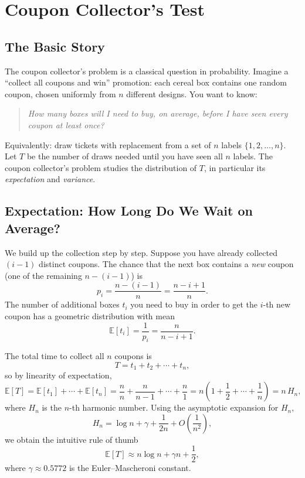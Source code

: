 \chapter{Coupon Collector's Test}

\section{The Basic Story}
The coupon collector's problem\cite{wiki:coupon-collector} is a classical question in probability.  Imagine
a ``collect all coupons and win'' promotion: each cereal box contains one
random coupon, chosen uniformly from \(n\) different designs.  You want to know:
\begin{quote}
  \emph{How many boxes will I need to buy, on average, before I have seen
  every coupon at least once?}
\end{quote}

Equivalently: draw tickets with replacement from a set of \(n\) labels
\(\{1,2,\dots,n\}\).  Let \(T\) be the number of draws needed until you have
seen all \(n\) labels.  The coupon collector's problem studies the distribution
of \(T\), in particular its \emph{expectation} and \emph{variance}.

\section{Expectation: How Long Do We Wait on Average?}
We build up the collection step by step.  Suppose you have already collected
\((i-1)\) distinct coupons.  The chance that the next box contains a \emph{new}
coupon (one of the remaining \(n-(i-1)\)) is
\[
  p_i = \frac{n-(i-1)}{n} = \frac{n-i+1}{n}.
\]
The number of additional boxes \(t_i\) you need to buy in order to get the
\(i\)-th new coupon has a geometric distribution with mean
\[
  \mathbb{E}[t_i] = \frac{1}{p_i} = \frac{n}{n-i+1}.
\]

The total time to collect all \(n\) coupons is
\[
  T = t_1 + t_2 + \cdots + t_n,
\]
so by linearity of expectation,
\[
  \mathbb{E}[T]
  = \mathbb{E}[t_1] + \cdots + \mathbb{E}[t_n]
  = \frac{n}{n} + \frac{n}{n-1} + \cdots + \frac{n}{1}
  = n \left( 1 + \frac{1}{2} + \cdots + \frac{1}{n} \right)
  = n\,H_n,
\]
where \(H_n\) is the \(n\)-th harmonic number.  Using the asymptotic expansion
for \(H_n\),
\[
  H_n = \log n + \gamma + \frac{1}{2n} + O\!\left(\frac{1}{n^2}\right),
\]
we obtain the intuitive rule of thumb
\[
  \mathbb{E}[T] \approx n \log n + \gamma n + \frac{1}{2},
\]
where \(\gamma \approx 0.5772\) is the Euler--Mascheroni constant.

